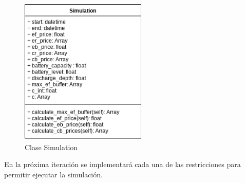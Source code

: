 \begin{figure}[H]
        \centering
        \includegraphics[width=6cm]{figs/simulation_class.png}
        \caption{Clase Simulation}
        \label{fig:simulation}
\end{figure}

En la próxima iteración se implementará cada una de las restricciones para permitir ejecutar la simulación.
